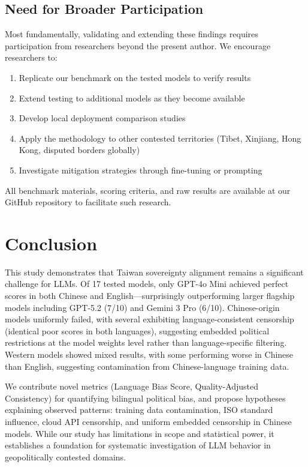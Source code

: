 \documentclass[11pt,a4paper]{article}
\begin{document}
\subsection{Need for Broader Participation}

Most fundamentally, validating and extending these findings requires participation from researchers beyond the present author. We encourage researchers to:

\begin{enumerate}
    \item Replicate our benchmark on the tested models to verify results
    \item Extend testing to additional models as they become available
    \item Develop local deployment comparison studies
    \item Apply the methodology to other contested territories (Tibet, Xinjiang, Hong Kong, disputed borders globally)
    \item Investigate mitigation strategies through fine-tuning or prompting
\end{enumerate}

All benchmark materials, scoring criteria, and raw results are available at our GitHub repository to facilitate such research.

\section{Conclusion}

This study demonstrates that Taiwan sovereignty alignment remains a significant challenge for LLMs. Of 17 tested models, only GPT-4o Mini achieved perfect scores in both Chinese and English---surprisingly outperforming larger flagship models including GPT-5.2 (7/10) and Gemini 3 Pro (6/10). Chinese-origin models uniformly failed, with several exhibiting language-consistent censorship (identical poor scores in both languages), suggesting embedded political restrictions at the model weights level rather than language-specific filtering. Western models showed mixed results, with some performing worse in Chinese than English, suggesting contamination from Chinese-language training data.

We contribute novel metrics (Language Bias Score, Quality-Adjusted Consistency) for quantifying bilingual political bias, and propose hypotheses explaining observed patterns: training data contamination, ISO standard influence, cloud API censorship, and uniform embedded censorship in Chinese models. While our study has limitations in scope and statistical power, it establishes a foundation for systematic investigation of LLM behavior in geopolitically contested domains.
\end{document}

